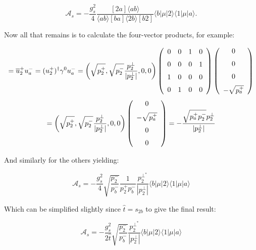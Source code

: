 			\begin{equation}
			\mathcal{A}_s=-\frac{g^2_s}{4}\frac{[2a]\langle ab\rangle}{\langle ab\rangle[ba]
			\langle2b\rangle[b2]}\langle{b}|\mu|2\rangle\langle{1}|\mu|a\rangle.
			\end{equation}

			Now all that remains is to calculate the four-vector products, for example:

			\begin{equation}
				[2a]=\overline{u}^+_2u^-_a=(u^+_2)^\dagger\gamma^0u^-_a=\left(\sqrt{p^+_2},
				\sqrt{p^-_2}\frac{p^{\perp}_2}{|p_2^\perp|}, 0, 0\right)
				\left(\begin {array}{cccc} 0&0&1&0\\ \noalign{\medskip}0&0&0&1
				\\ \noalign{\medskip}1&0&0&0\\ \noalign{\medskip}0&1&0&0\end {array}\right)\left( \begin {array}{c} 0\\ \noalign{\medskip}0\\ \noalign{\medskip}0\\ \noalign{\medskip}-\sqrt{p^+_a}\end {array}\right)
			\end{equation}
			\begin{equation}
				[2a]=\left(\sqrt{p^+_2}, \sqrt{p^-_2}\frac{p^{\perp}_2}{|p_2^\perp|}, 0, 0\right)\left( \begin {array}{c} 0\\ \noalign{\medskip}-\sqrt{p^+_a}\\
				\noalign{\medskip}0\\ \noalign{\medskip}0\end {array}\right)=-\frac{\sqrt{p_a^+p_2^-}p_2^\perp}{|p_2^\perp|}
			\end{equation}

			And similarly for the others yielding:

			\begin{equation}
				\mathcal{A}_s=-\frac{g_s^2}{4}\sqrt{\frac{p_2^-}{p_b^-}}\frac{1}{p_2^+p_b^-}
				\frac{p_2^{\perp^*}}{|p_2^\perp|}\langle{b}|\mu|2\rangle\langle{1}|\mu|a\rangle
			\end{equation}

			Which can be simplified slightly since $\hat{t}=s_{2b}$ to give the final result:

			\begin{equation}
				\mathcal{A}_s=-\frac{g_s^2}{2\hat{t}}\sqrt{\frac{p_2^-}{p_b^-}}\frac{p_2^{\perp^*}}
				{|p_2^\perp|}\langle{b}|\mu|2\rangle\langle{1}|\mu|a\rangle
			\end{equation}

